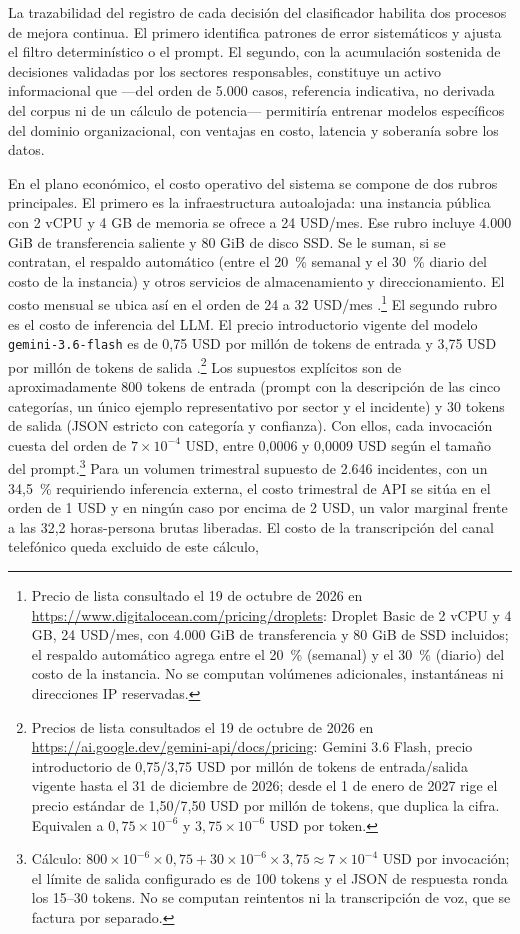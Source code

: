 La trazabilidad del registro de cada decisión del clasificador habilita dos procesos de mejora continua. El primero identifica patrones de error sistemáticos y ajusta el filtro determinístico o el prompt. El segundo, con la acumulación sostenida de decisiones validadas por los sectores responsables, constituye un activo informacional que ---del orden de 5.000 casos, referencia indicativa, no derivada del corpus ni de un cálculo de potencia--- permitiría entrenar modelos específicos del dominio organizacional, con ventajas en costo, latencia y soberanía sobre los datos.

En el plano económico, el costo operativo del sistema se compone de dos rubros principales. El primero es la infraestructura autoalojada: una instancia pública con 2 vCPU y 4 GB de memoria se ofrece a 24 USD/mes. Ese rubro incluye 4.000 GiB de transferencia saliente y 80 GiB de disco SSD. Se le suman, si se contratan, el respaldo automático (entre el 20~\% semanal y el 30~\% diario del costo de la instancia) y otros servicios de almacenamiento y direccionamiento. El costo mensual se ubica así en el orden de 24 a 32 USD/mes \parencite{DigitalOcean2026_pricing}.\footnote{Precio de lista consultado el 19 de octubre de 2026 en \url{https://www.digitalocean.com/pricing/droplets}: Droplet Basic de 2 vCPU y 4 GB, 24 USD/mes, con 4.000 GiB de transferencia y 80 GiB de SSD incluidos; el respaldo automático agrega entre el 20~\% (semanal) y el 30~\% (diario) del costo de la instancia. No se computan volúmenes adicionales, instantáneas ni direcciones IP reservadas.} El segundo rubro es el costo de inferencia del LLM. El precio introductorio vigente del modelo \texttt{gemini-3.6-flash} es de 0,75 USD por millón de tokens de entrada y 3,75 USD por millón de tokens de salida \parencite{Google2026_gemini_api_pricing}.\footnote{Precios de lista consultados el 19 de octubre de 2026 en \url{https://ai.google.dev/gemini-api/docs/pricing}: Gemini 3.6 Flash, precio introductorio de 0,75/3,75 USD por millón de tokens de entrada/salida vigente hasta el 31 de diciembre de 2026; desde el 1 de enero de 2027 rige el precio estándar de 1,50/7,50 USD por millón de tokens, que duplica la cifra. Equivalen a \(0{,}75\times10^{-6}\) y \(3{,}75\times10^{-6}\) USD por token.} Los supuestos explícitos son de aproximadamente 800 tokens de entrada (prompt con la descripción de las cinco categorías, un único ejemplo representativo por sector y el incidente) y 30 tokens de salida (JSON estricto con categoría y confianza). Con ellos, cada invocación cuesta del orden de \(7\times10^{-4}\) USD, entre 0,0006 y 0,0009 USD según el tamaño del prompt.\footnote{Cálculo: \(800\times10^{-6}\times0{,}75 + 30\times10^{-6}\times3{,}75 \approx 7\times10^{-4}\) USD por invocación; el límite de salida configurado es de 100 tokens y el JSON de respuesta ronda los 15--30 tokens. No se computan reintentos ni la transcripción de voz, que se factura por separado.} Para un volumen trimestral supuesto de 2.646 incidentes, con un 34,5~\% requiriendo inferencia externa, el costo trimestral de API se sitúa en el orden de 1 USD y en ningún caso por encima de 2 USD, un valor marginal frente a las 32,2 horas-persona brutas liberadas. El costo de la transcripción del canal telefónico queda excluido de este cálculo, 